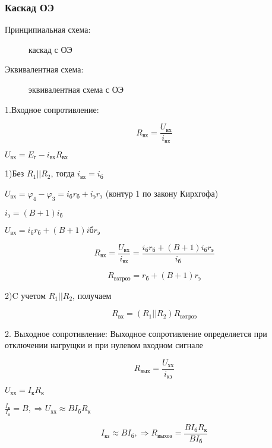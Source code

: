 \subsubsection{Каскад ОЭ}
\label{OEssil}
Принципиальная схема:
\begin{center}
	\begin{figure}[h!]
		\caption{каскад с ОЭ}
	\end{figure}
\end{center}

Эквивалентная схема:
\begin{center}
	\begin{figure}[h!]
		\caption{эквивалентная схема с ОЭ}
	\end{figure}
\end{center}

1.Входное сопротивление:

$$R_{\textit{вх}}=\frac{U_{\textit{вх}}}{i_{\textit{вх}}}$$

$U_{\textit{вх}}= E_{\textit{г}} - i_{\textit{вх}}R_{\textit{вх}}$

1)Без $R_1 || R_2$, тогда $i_\textit{вх}=i_\textit{б}$

$U_{\textit{вх}}=\varphi_4-\varphi_3=i_\textit{б}r_\textit{б}+i_\textit{э}r_\textit{э}$
(контур 1 по закону Кирхгофа)

$i_{\textit{э}}=(B+1)i_\textit{б}$

$U_{\textit{вх}}=i_\textit{б}r_\textit{б}+(B+1)i\textit{б}r_\textit{э}$

$$
R_{\textit{вх}} = \frac{U_{\textit{вх}}}{i_{\textit{вх}}} = \frac{i_{\textit{б}}r_{\textit{б}} + (B+1)i_{\textit{б}}r_{\textit{э}} }{i_{\textit{б}}}
$$

$$
R_\textit{вхтроэ}=r_\textit{б} + (B+1)r_\textit{э}
$$

2)C учетом $R_1 || R_2$, получаем

$$
R_\textit{вх}=(R_1||R_2)R_\textit{вхтроэ}
$$

2. Выходное сопротивление:
 Выходное сопротивление определяется при отключении нагрущки и при нулевом входном сигнале
 
 $$R_\textit{вых}=\frac{U_\textit{хх}}{i_\textit{кз}}$$

$ U_\textit{хх}=I_\textit{к}R_\textit{к} $

$\frac{I_\textit{к}}{I_\textit{б}}=B,\Rightarrow U_\textit{хх}\approx BI_\textit{б}R_\textit{к}$

$$
I_\textit{кз}\approx BI_\textit{б},\Rightarrow R_\textit{выхоэ}=\frac{BI_\textit{б}R_\textit{к}}{BI_\textit{б}}
$$

